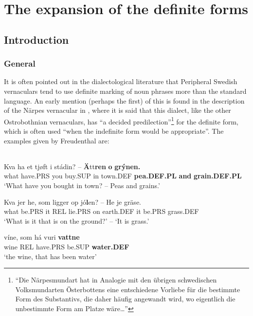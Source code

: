  
\newcommand{\gl}{}
\newcommand{\textstyleBodyTextFirstChar}{}
\newcommand{\textstyleBodytextCChar}{}

\chapter{The expansion of the definite forms}
\label{bkm:Ref155077895}\label{bkm:Ref156803843}\label{bkm:Ref160007852}\section{ Introduction}
\subsection{ General}

It is often pointed out in the dialectological literature that Peripheral Swedish vernaculars tend to use definite marking of noun phrases more than the standard language. An early mention (perhaps the first) of this is found in the description of the Närpes vernacular in \citet[137]{Freudenthal1878}, where it is said that this dialect, like the other Ostrobothnian vernaculars, has “a decided predilection”\footnote{ “Die Närpesmundart hat in Analogie mit den übrigen schwedischen Volksmundarten Österbottens eine entschiedene Vorliebe für die bestimmte Form des Substantivs, die daher häufig angewandt wird, wo eigentlich die unbestimmte Form am Platze wäre…”} for the definite form, which is often used “when the indefinite form would be appropriate”. The examples given by Freudenthal are:

\ea\label{}
\\
	\ea
		\gll	Kva ha et  tjøft  i  stádin?  --  \textbf{Ä}tt\textbf{ren} \textbf{o} \textbf{grýnen.}\\
				what have.PRS you  buy.SUP  in  town.DEF {}   \textbf{pea.DEF.PL} \textbf{and} \textbf{grain.DEF.PL}\\
		\glt 	‘What have you bought in town? – Peas and grains.’

	\ex
		\gll	Kva  jer  he,  som  ligger  op  jó\textbf{l}en?  --  He  je  gräse.\\
				what  be.PRS  it  REL  lie.PRS  on  earth.DEF {}   it  be.PRS  grass.DEF\\
		\glt 	‘What is it that is on the ground?’ – ‘It is grass.’

	\ex
		\gll	víne,  som  há  vuri  \textbf{vattne}\\
				wine  REL  have.PRS  be.SUP  \textbf{water.DEF}\\
		\glt 	‘the wine, that has been water’

